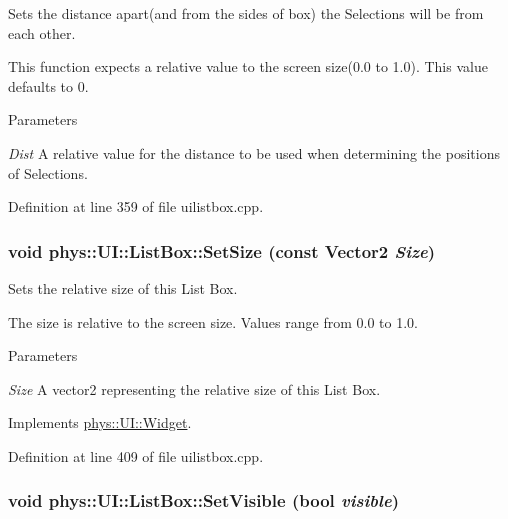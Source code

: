 Sets the distance apart(and from the sides of box) the Selections will be from each other. 

This function expects a relative value to the screen size(0.0 to 1.0). This value defaults to 0. 
\begin{DoxyParams}{Parameters}
\item[{\em Dist}]A relative value for the distance to be used when determining the positions of Selections. \end{DoxyParams}


Definition at line 359 of file uilistbox.cpp.

\hypertarget{classphys_1_1UI_1_1ListBox_a73f4526ffb4d35a431bb62c816257169}{
\subsubsection[{SetSize}]{\setlength{\rightskip}{0pt plus 5cm}void phys::UI::ListBox::SetSize (const {\bf Vector2} {\em Size})}}
\label{d0/d28/classphys_1_1UI_1_1ListBox_a73f4526ffb4d35a431bb62c816257169}


Sets the relative size of this List Box. 

The size is relative to the screen size. Values range from 0.0 to 1.0. 
\begin{DoxyParams}{Parameters}
\item[{\em Size}]A vector2 representing the relative size of this List Box. \end{DoxyParams}


Implements \hyperlink{classphys_1_1UI_1_1Widget_a3fe0b767fea59e1d120ed37b26c99044}{phys::UI::Widget}.



Definition at line 409 of file uilistbox.cpp.

\hypertarget{classphys_1_1UI_1_1ListBox_abb3c87bf6669100296c1fa4f4913ea33}{
\subsubsection[{SetVisible}]{\setlength{\rightskip}{0pt plus 5cm}void phys::UI::ListBox::SetVisible (bool {\em visible})}}
\label{d0/d28/classphys_1_1UI_1_1ListBox_abb3c87bf6669100296c1fa4f4913ea33}


